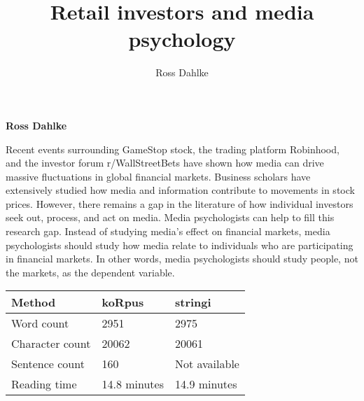 \documentclass[12pt,]{article}
\title{Retail investors and media psychology  }
\author{\Large Ross Dahlke\vspace{0.05in} \newline\normalsize\emph{}  }
\date{}
\newcommand*{\authorfont}{\fontfamily{phv}\selectfont}
\renewenvironment{abstract}
 {{%
    \setlength{\leftmargin}{0mm}
    \setlength{\rightmargin}{\leftmargin}%
  }%
  \relax}
 {\endlist}
\begin{document}
	
%

{%
\setlength{\parindent}{0pt}
\thispagestyle{plain}
{\fontsize{18}{20}\selectfont\raggedright 
\maketitle  %

}

{
   \vskip 13.5pt\relax \normalsize\fontsize{11}{12} 
\textbf{\authorfont Ross Dahlke} \hskip 15pt \emph{\small }   

}

}








\begin{abstract}

    \hbox{\vrule height .2pt width 39.14pc}

    \vskip 8.5pt %

\noindent Recent events surrounding GameStop stock, the trading platform
Robinhood, and the investor forum r/WallStreetBets have shown how media
can drive massive fluctuations in global financial markets. Business
scholars have extensively studied how media and information contribute
to movements in stock prices. However, there remains a gap in the
literature of how individual investors seek out, process, and act on
media. Media psychologists can help to fill this research gap. Instead
of studying media's effect on financial markets, media psychologists
should study how media relate to individuals who are participating in
financial markets. In other words, media psychologists should study
people, not the markets, as the dependent variable.


    \hbox{\vrule height .2pt width 39.14pc}


\end{abstract}


\vskip -8.5pt



\noindent \doublespacing 

\begin{longtable}[]{@{}lll@{}}
\toprule
Method & koRpus & stringi\tabularnewline
\midrule
\endhead
Word count & 2951 & 2975\tabularnewline
Character count & 20062 & 20061\tabularnewline
Sentence count & 160 & Not available\tabularnewline
Reading time & 14.8 minutes & 14.9 minutes\tabularnewline
\bottomrule
\end{longtable}
\end{document}
